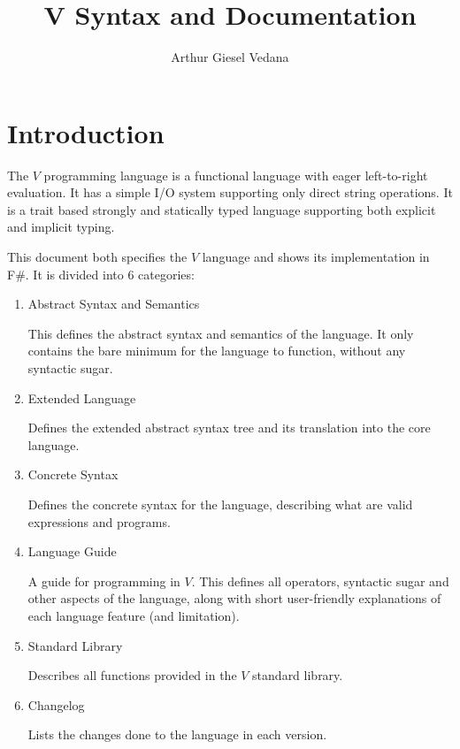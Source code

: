 \documentclass{article}
\author{Arthur Giesel Vedana}
\title{V Syntax and Documentation}
\begin{document}
\maketitle
{}
\newpage

\tableofcontents
\newpage

\section*{Introduction}
The $V$ programming language is a functional language with eager left-to-right evaluation.
It has a simple I/O system supporting only direct string operations.
It is a trait based strongly and statically typed language supporting both explicit and implicit typing.


This document both specifies the $V$ language and shows its implementation in F\#.
It is divided into 6 categories:
\begin{enumerate}
    \item Abstract Syntax and Semantics

        This defines the abstract syntax and semantics of the language.
        It only contains the bare minimum for the language to function, without any syntactic sugar.

    \item Extended Language

        Defines the extended abstract syntax tree and its translation into the core language.

    \item Concrete Syntax

        Defines the concrete syntax for the language, describing what are valid expressions and programs.

    \item Language Guide

        A guide for programming in $V$.
        This defines all operators, syntactic sugar and other aspects of the language, along with short user-friendly explanations of each language feature (and limitation).

    \item Standard Library

        Describes all functions provided in the $V$ standard library.

    \item Changelog

         Lists the changes done to the language in each version.
\end{enumerate}
\end{document}

